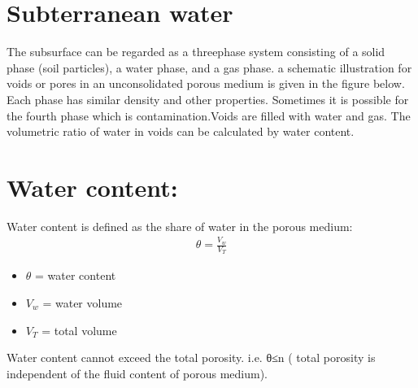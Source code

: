 \documentclass[letterpaper,10pt,english]{jupyterBook}
\let\sphinxpxdimen\pdfpxdimen\else\newdimen\sphinxpxdimen
\begin{document}
\section{Subterranean water}
\label{\detokenize{content/flow/12_subsurface_structure:subterranean-water}}
\sphinxAtStartPar
The subsurface can be regarded as a three\sphinxhyphen{}phase system consisting of a solid phase (soil particles), a water phase, and a gas phase. a schematic illustration for voids or pores in an unconsolidated porous medium is given in the figure below. Each phase has similar density and other properties. Sometimes it is possible for the fourth phase which is contamination.Voids are filled with water and gas. The volumetric ratio of water in voids can be calculated by water content.

\noindent{\hspace*{\fill}\sphinxincludegraphics[width=400\sphinxpxdimen]{{L02_fig10}.png}\hspace*{\fill}}


\section{Water content:}
\label{\detokenize{content/flow/12_subsurface_structure:water-content}}
\sphinxAtStartPar
Water content is defined as the share of water in the porous medium:
\begin{equation*}
\begin{split} {\theta}=\frac{V_{w}}{V_{T}} \end{split}
\end{equation*}\begin{itemize}
\item {} 
\sphinxAtStartPar
\( {\theta}\) = water content

\item {} 
\sphinxAtStartPar
\( {V_{w}}\) = water volume

\item {} 
\sphinxAtStartPar
\( {V_{T}} \) = total volume

\end{itemize}

\sphinxAtStartPar
Water content cannot exceed the total porosity. i.e. θ≤n ( total porosity is independent of the fluid content of porous medium).
\end{document}
